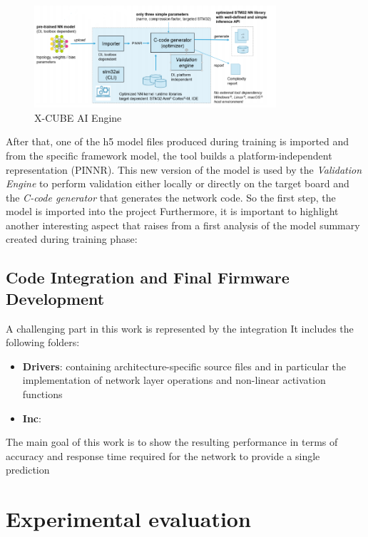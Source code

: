 \begin{figure}[H]
	\hfill\includegraphics[width=0.8\textwidth]{figures/stm32cubeai_arch.png}\hspace*{\fill}
	\caption{X-CUBE AI Engine}
\end{figure}

After that, one of the h5 model files produced during training is imported and from the specific framework model, the tool builds a platform-independent representation (PINNR).\newline 
This new version of the model is used by the \textit{Validation Engine} to perform validation either locally or directly on the target board and the \textit{C-code generator} that generates the network code.\newline
So the first step, the model is imported into the project
Furthermore, it is important to highlight another interesting aspect that raises from a first analysis of the model summary created during training phase:




\subsection{Code Integration and Final Firmware Development}
 A challenging part in this work is represented by the integration  It includes the following folders:
\begin{itemize}
	\item \textbf{Drivers}: containing architecture-specific source files and in particular the implementation of network layer operations and non-linear activation functions
	\item \textbf{Inc}:  
\end{itemize} 



The main goal of this work is to show the resulting performance in terms of accuracy and response time required for the network to provide a single prediction


\section{Experimental evaluation}

